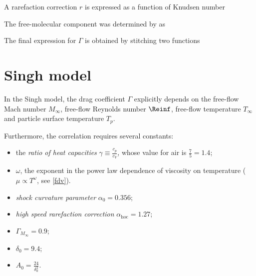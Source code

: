 
    A rarefaction correction $r$ is expressed as a function of Knudsen number


    The free-molecular component was determined by \citet{patterson1971} as

    The final expression for $\Gamma$ is obtained by stitching two functions

\section{Singh model} \label{DS}
    In the Singh model, the drag coefficient $\Gamma$ explicitly depends on the
    free-flow Mach number $M_\infty$, free-flow Reynolds number $\Reinf$,
    free-flow temperature $T_\infty$ and particle surface temperature $T_p$.

    Furthermore, the correlation requires several constants:
    \begin{itemize}
        \item the \emph{ratio of heat capacities} $\gamma \equiv \frac{c_p}{c_V}$,
            whose value for air is $\frac{7}{5} = \num{1.4}$;
        \item $\omega$, the exponent in the power law dependence
            of viscosity on temperature ($\mu \propto T^\omega$, see \cref{fdv}).
        \item \emph{shock curvature parameter} $\alpha_0 = \num{0.356}$;
        \item \emph{high speed rarefaction correction} $\alpha_\mathrm{hoc} = \num{1.27}$;
        \item \emph{} $\Gamma_{M_\infty} = \num{0.9}$;
        \item \emph{} $\delta_0 = \num{9.4}$;
        \item $A_0 = \frac{24}{\delta_0^2}$.
    \end{itemize}

